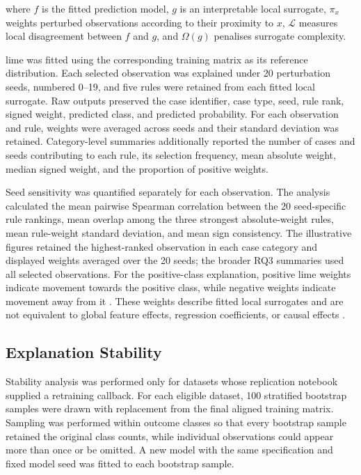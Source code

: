 where $f$ is the fitted prediction model, $g$ is an interpretable local surrogate, $\pi_x$ weights perturbed observations according to their proximity to $x$, $\mathcal{L}$ measures local disagreement between $f$ and $g$, and $\Omega(g)$ penalises surrogate complexity.

\gls{lime} was fitted using the corresponding training matrix as its reference distribution. Each selected observation was explained under 20 perturbation seeds, numbered 0--19, and five rules were retained from each fitted local surrogate. Raw outputs preserved the case identifier, case type, seed, rule rank, signed weight, predicted class, and predicted probability. For each observation and rule, weights were averaged across seeds and their standard deviation was retained. Category-level summaries additionally reported the number of cases and seeds contributing to each rule, its selection frequency, mean absolute weight, median signed weight, and the proportion of positive weights.

Seed sensitivity was quantified separately for each observation. The analysis calculated the mean pairwise Spearman correlation between the 20 seed-specific rule rankings, mean overlap among the three strongest absolute-weight rules, mean rule-weight standard deviation, and mean sign consistency. The illustrative figures retained the highest-ranked observation in each case category and displayed weights averaged over the 20 seeds; the broader RQ3 summaries used all selected observations. For the positive-class explanation, positive \gls{lime} weights indicate movement towards the positive class, while negative weights indicate movement away from it \citep{ribeiro_why_2016}. These weights describe fitted local surrogates and are not equivalent to global feature effects, regression coefficients, or causal effects \citep{ribeiro_why_2016, vilone_classification_2021}.

\subsection{Explanation Stability}

Stability analysis was performed only for datasets whose replication notebook supplied a retraining callback. For each eligible dataset, 100 stratified bootstrap samples were drawn with replacement from the final aligned training matrix. Sampling was performed within outcome classes so that every bootstrap sample retained the original class counts, while individual observations could appear more than once or be omitted. A new model with the same specification and fixed model seed was fitted to each bootstrap sample.

